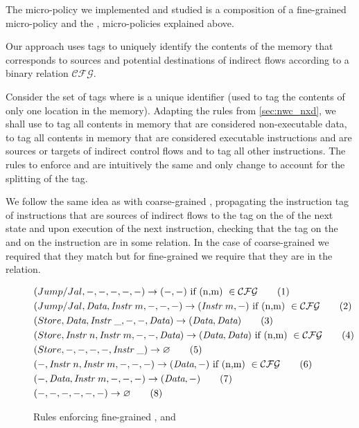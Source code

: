 The micro-policy we implemented and studied is a composition of a fine-grained
\CFI micro-policy and the \NWC, \NXDname micro-policies explained above.

Our approach uses tags to uniquely identify the contents of the memory that 
corresponds to sources and potential destinations of indirect flows according to
a binary relation $\mathcal{CFG}$.

Consider the set of tags 
 where  is a unique identifier 
(\IE used to tag the contents of only one location in the memory). 
Adapting the rules from \ref{sec:nwc_nxd}, we shall use \DATAname to tag all 
contents in memory that are considered non-executable data, 
to tag all contents in memory that are considered executable instructions and 
are sources or targets of indirect control flows and \INSTR{$\bot$} to tag all
other instructions.
The rules to enforce \NWCname and \NXDname are intuitively the same and only
change to account for the splitting of the \INSTRname tag.

We follow the same idea as with coarse-grained \CFI, propagating the instruction
tag of instructions that are sources of indirect flows to the tag on the \pc of
the next state and upon execution of the next instruction, checking that the tag
on the \pc and on the instruction are in some relation. In the case of
coarse-grained \CFI we required that they match but for fine-grained \CFI we
require that they are in the \CFG relation.

\begin{figure}[!htpb]
\begin{align}
 & (Jump/Jal, -,-, -, -, -) \rightarrow (- ,-) 
 \text{ if (n,m) } \in \mathcal{CFG} \label{fine_rule1} \tag{1} \\
 & (Jump/Jal, \textit{Data}, \textit{Instr}~m, -, -, -) \rightarrow (\textit{Instr}~m,-) 
 \text{ if (n,m) } \in \mathcal{CFG} \label{fine_rule2} \tag{2} \\
 & (Store, \textit{Data}, \textit{Instr}~\_, -, -, \textit{Data}) \rightarrow (\textit{Data},\textit{Data}) 
 \label{fine_rule3} \tag{3} \\
 & (Store, \textit{Instr}~n, \textit{Instr}~m, -, -, \textit{Data}) \rightarrow (\textit{Data},\textit{Data})
 \text{ if (n,m) } \in \mathcal{CFG} \label{fine_rule4} \tag{4} \\
 & (Store, -, -, -, -, \textit{Instr}~\_) \rightarrow \varnothing
  \label{fine_rule5} \tag{5} \\
 & (-, \textit{Instr}~n, \textit{Instr}~m, -, -, -) \rightarrow (\textit{Data},-)
 \text{ if (n,m) } \in \mathcal{CFG} \label{fine_rule6} \tag{6} \\
 & (-, \textit{Data}, \textit{Instr}~m, -, -, -) \rightarrow (\textit{Data},-) \label{fine_rule7} 
 \tag{7}\\
 & (-, -, -, -, -, -) \rightarrow \varnothing \label{fine_rule8} 
 \tag{8}
\end{align}
\caption{Rules enforcing fine-grained \CFI, \NXDname and \NWC}
\end{figure}








